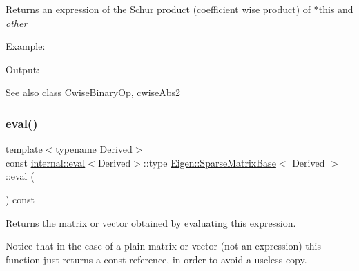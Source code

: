 \begin{DoxyReturn}{Returns}
an expression of the Schur product (coefficient wise product) of $\ast$this and {\itshape other} 
\end{DoxyReturn}
Example\+: 
\begin{DoxyCodeInclude}{0}
\end{DoxyCodeInclude}
 Output\+: 
\begin{DoxyVerbInclude}
\end{DoxyVerbInclude}


\begin{DoxySeeAlso}{See also}
class \mbox{\hyperlink{class_eigen_1_1_cwise_binary_op}{Cwise\+Binary\+Op}}, \mbox{\hyperlink{class_eigen_1_1_sparse_matrix_base_a2052c2ae010743f6b76a8da5912350b4}{cwise\+Abs2}} 
\end{DoxySeeAlso}
\mbox{\label{class_eigen_1_1_sparse_matrix_base_a761bd872a06b59632fcff7b7807a77ce}} 
\subsubsection{\texorpdfstring{eval()}{eval()}}
{\footnotesize\ttfamily template$<$typename Derived$>$ \\
const \mbox{\hyperlink{struct_eigen_1_1internal_1_1eval}{internal\+::eval}}$<$Derived$>$\+::type \mbox{\hyperlink{class_eigen_1_1_sparse_matrix_base}{Eigen\+::\+Sparse\+Matrix\+Base}}$<$ Derived $>$\+::eval (\begin{DoxyParamCaption}{ }\end{DoxyParamCaption}) const\hspace{0.3cm}{\ttfamily [inline]}}

\begin{DoxyReturn}{Returns}
the matrix or vector obtained by evaluating this expression.
\end{DoxyReturn}
Notice that in the case of a plain matrix or vector (not an expression) this function just returns a const reference, in order to avoid a useless copy. \mbox{\label{class_eigen_1_1_sparse_matrix_base_a6b3f24af4a70e2824a52fbe909872274}} 
